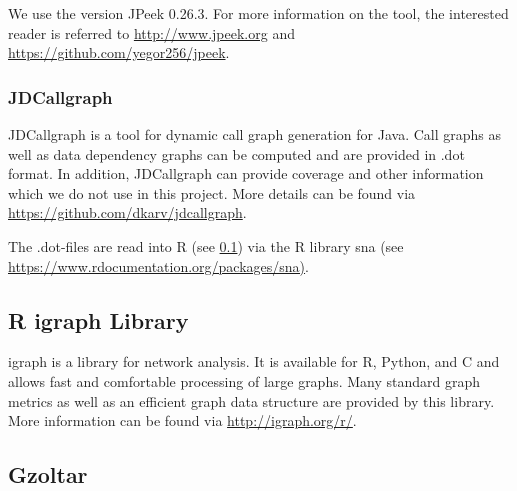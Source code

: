 \documentclass{scrartcl}
\begin{document}
We use the version JPeek 0.26.3. For more information on the tool, the
interested reader is referred to \url{http://www.jpeek.org} and
\url{https://github.com/yegor256/jpeek}.

\subsubsection{JDCallgraph}
\label{sec:jdcallgraph}

JDCallgraph is a tool for dynamic call graph generation for Java. Call graphs as
well as data dependency graphs can be computed and are provided in .dot format.
In addition, JDCallgraph can provide coverage and other information which we do
not use in this project. More details can be found via
\url{https://github.com/dkarv/jdcallgraph}.

The .dot-files are read into R (see \ref{sec:igraph}) via the R library sna (see
\url{https://www.rdocumentation.org/packages/sna)}.

\subsection{R igraph Library}
\label{sec:igraph}

igraph is a library for network analysis. It is available for R, Python, and C
and allows fast and comfortable processing of large graphs. Many standard graph
metrics as well as an efficient graph data structure  are provided by this
library. More information can be found via \url{http://igraph.org/r/}.

\subsection{Gzoltar}
\label{sec:gzoltar}
\end{document}
